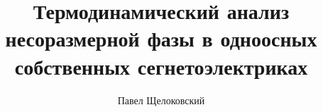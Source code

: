 \author{Павел Щелоковский}
\title{Термодинамический анализ несоразмерной фазы в одноосных собственных сегнетоэлектриках}